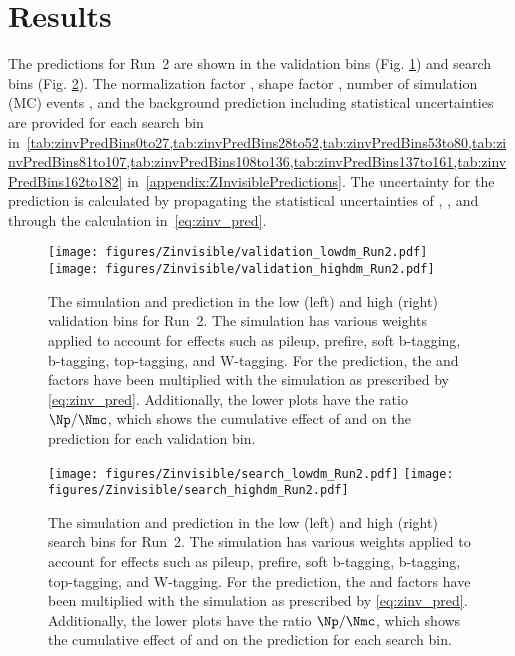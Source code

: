 \section{Results}
\label{sec:zinvisible-results}

The \zinv predictions for Run~2 are shown in the validation bins (Fig. \ref{fig:zinv_validation}) and search bins (Fig. \ref{fig:zinv_search}).
The normalization factor \Rz, shape factor \Sg, number of \znunu simulation (MC) events \Nmc, and the background prediction \Np including statistical uncertainties are provided for each search bin in~\cref{tab:zinvPredBins0to27,tab:zinvPredBins28to52,tab:zinvPredBins53to80,tab:zinvPredBins81to107,tab:zinvPredBins108to136,tab:zinvPredBins137to161,tab:zinvPredBins162to182} in~\cref{appendix:ZInvisiblePredictions}.
The uncertainty for the prediction \Np is calculated by propagating the statistical uncertainties of \Rz, \Sg, and \Nmc through the calculation in~\cref{eq:zinv_pred}.

\begin{figure}[tbp]
{
\centering
\texttt{[image: figures/Zinvisible/validation\_lowdm\_Run2.pdf]}
\texttt{[image: figures/Zinvisible/validation\_highdm\_Run2.pdf]}
\caption[The \znunu simulation and \zinv prediction in the low \dm and high \dm validation bins for Run~2]
{
    The \znunu simulation and \zinv prediction in the low \dm (left) and high \dm (right) validation bins for Run~2.
    The \znunu simulation has various weights applied to account for effects such as pileup, prefire, soft b-tagging, b-tagging, top-tagging, and W-tagging.
    For the \zinv prediction, the \Rz and \Sg factors have been multiplied with the \znunu simulation as prescribed by \cref{eq:zinv_pred}.
    Additionally, the lower plots have the ratio $\Np/\Nmc$, which shows the cumulative effect of \Rz and \Sg on the prediction for each validation bin.
}
\label{fig:zinv_validation}
}
\end{figure}

\begin{figure}[tbp]
{
\centering
\texttt{[image: figures/Zinvisible/search\_lowdm\_Run2.pdf]}
\texttt{[image: figures/Zinvisible/search\_highdm\_Run2.pdf]}
\caption[The \znunu simulation and \zinv prediction in the low \dm and high \dm search bins for Run~2]
{
    The \znunu simulation and \zinv prediction in the low \dm (left) and high \dm (right) search bins for Run~2.
    The \znunu simulation has various weights applied to account for effects such as pileup, prefire, soft b-tagging, b-tagging, top-tagging, and W-tagging.
    For the \zinv prediction, the \Rz and \Sg factors have been multiplied with the \znunu simulation as prescribed by \cref{eq:zinv_pred}.
    Additionally, the lower plots have the ratio $\Np/\Nmc$, which shows the cumulative effect of \Rz and \Sg on the prediction for each search bin.
}
\label{fig:zinv_search}
}
\end{figure}
